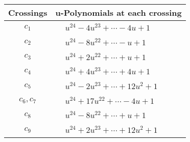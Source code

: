 \documentclass[1p]{elsarticle_modified}
\theoremstyle{definition}
\begin{document}
\begin{tabular}{m{50pt}|m{274pt}}
Crossings & \hspace{64pt}u-Polynomials at each crossing \\
\hline $$\begin{aligned}c_{1}\end{aligned}$$&$\begin{aligned}
&u^{24}-4 u^{23}+\cdots-4 u+1
\end{aligned}$\\
\hline $$\begin{aligned}c_{2}\end{aligned}$$&$\begin{aligned}
&u^{24}-8 u^{22}+\cdots- u+1
\end{aligned}$\\
\hline $$\begin{aligned}c_{3}\end{aligned}$$&$\begin{aligned}
&u^{24}+2 u^{22}+\cdots+u+1
\end{aligned}$\\
\hline $$\begin{aligned}c_{4}\end{aligned}$$&$\begin{aligned}
&u^{24}+4 u^{23}+\cdots+4 u+1
\end{aligned}$\\
\hline $$\begin{aligned}c_{5}\end{aligned}$$&$\begin{aligned}
&u^{24}-2 u^{23}+\cdots+12 u^2+1
\end{aligned}$\\
\hline $$\begin{aligned}c_{6},c_{7}\end{aligned}$$&$\begin{aligned}
&u^{24}+17 u^{22}+\cdots-4 u+1
\end{aligned}$\\
\hline $$\begin{aligned}c_{8}\end{aligned}$$&$\begin{aligned}
&u^{24}-8 u^{22}+\cdots+u+1
\end{aligned}$\\
\hline $$\begin{aligned}c_{9}\end{aligned}$$&$\begin{aligned}
&u^{24}+2 u^{23}+\cdots+12 u^2+1
\end{aligned}$\\

\end{tabular}
\end{document}
